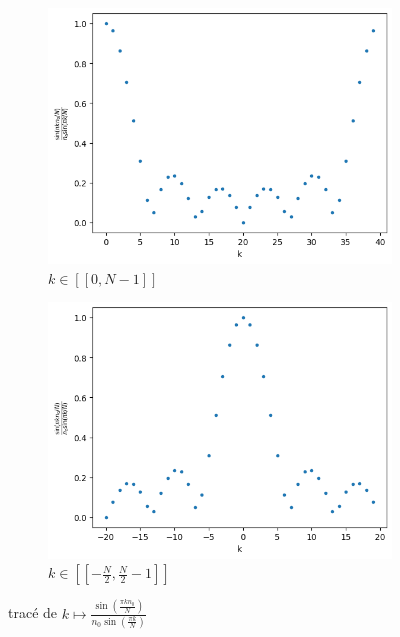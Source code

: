 \documentclass[11pt,oneside]{article}
\begin{document}
\begin{figure}[H]
    \centering
    \begin{subfigure}[b]{0.45\textwidth}
        \centering
        \includegraphics[width=\textwidth]{sinus_cardinal_decentre.png} %
        \caption{$k \in [\![0, N-1]\!]$}
        \label{fig:subfigure1}
    \end{subfigure}
    \hfill
    \begin{subfigure}[b]{0.45\textwidth}
        \centering
        \includegraphics[width=\textwidth]{sinus_cardinal_centre.png} %
        \caption{$k \in [\![-\frac{N}{2}, \frac{N}{2} - 1]\!]$}
        \label{fig:subfigure2}
    \end{subfigure}
    \caption{tracé de $k \mapsto \frac{\sin(\frac{\pi k n_0}{N})}{n_0 \sin(\frac{\pi k}{N})}$}
    \label{fig:mainfigure}
\end{figure}
\end{document}
